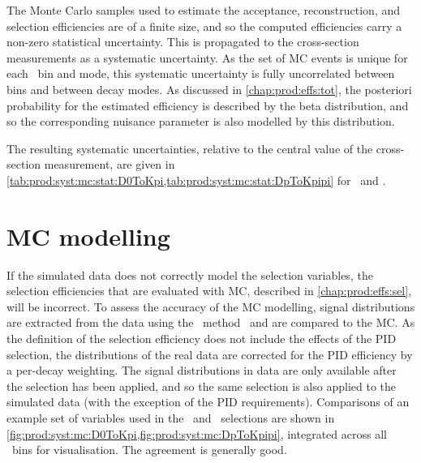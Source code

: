 The Monte Carlo samples used to estimate the acceptance, reconstruction, and 
selection efficiencies are of a finite size, and so the computed efficiencies 
carry a non-zero statistical uncertainty.
This is propagated to the cross-section measurements as a systematic 
uncertainty.
As the set of \ac{MC} events is unique for each \pTy\ bin and mode, this 
systematic uncertainty is fully uncorrelated between bins and between decay 
modes.
As discussed in \cref{chap:prod:effs:tot}, the posteriori probability 
for the estimated efficiency is described by the beta distribution, and so the 
corresponding nuisance parameter is also modelled by this distribution.

The resulting systematic uncertainties, relative to the central value of the 
cross-section measurement, are given in 
\cref{tab:prod:syst:mc:stat:D0ToKpi,tab:prod:syst:mc:stat:DpToKpipi} for 
\DzToKpi\ and \DpToKpipi.

\section{\acl{MC} modelling}
\label{chap:prod:syst:mc}

If the simulated data does not correctly model the selection variables, the 
selection efficiencies that are evaluated with \ac{MC}, described in 
\cref{chap:prod:effs:sel}, will be incorrect.
To assess the accuracy of the \acl{MC} modelling, signal distributions are 
extracted from the data using the \sPlot\ method~\cite{Pivk:2004ty} and are 
compared to the \ac{MC}.
As the definition of the selection efficiency does not include the effects of 
the \ac{PID} selection, the distributions of the real data are corrected for 
the \ac{PID} efficiency by a per-decay weighting.
The signal distributions in data are only available after the selection has 
been applied, and so the same selection is also applied to the simulated data 
(with the exception of the \ac{PID} requirements).
Comparisons of an example set of variables used in the \DzToKpi\ and 
\DpToKpipi\ selections are shown in 
\cref{fig:prod:syst:mc:D0ToKpi,fig:prod:syst:mc:DpToKpipi}, integrated across 
all \pTy\ bins for visualisation.
The agreement is generally good.

